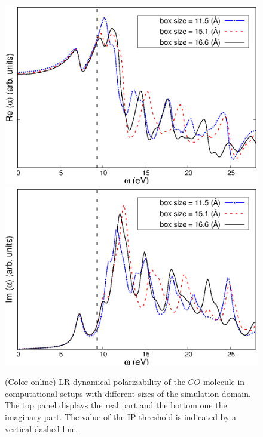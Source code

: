\documentclass[reprint,aps,prb]{revtex4-1}
\begin{document}
\begin{figure}
\centering
\subfloat
{\includegraphics[scale=0.56]{Fig2a_CO_AlphaOmegaReal.eps}} \\
\centering
\subfloat
{\includegraphics[scale=0.58]{Fig2b_CO_spectrum.eps}}
\caption{\label{co_spectrum}(Color online) LR dynamical polarizability of the $CO$ molecule in computational setups with different 
sizes of the simulation domain. The top panel displays the real part and the bottom one the imaginary part. The value of the IP threshold 
is indicated by a vertical dashed line.}
\end{figure}

\end{document}
